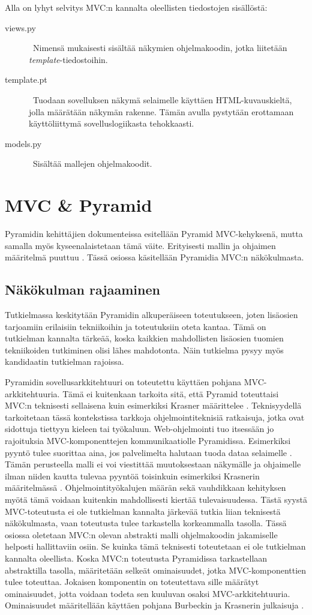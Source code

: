 \documentclass[finnish,utf8,nonumbib,palatino,kandi]{gradu2}
\begin{document}
Alla on lyhyt selvitys MVC:n kannalta oleellisten tiedostojen sisällöstä:
\begin{description}
\item [views.py] \ Nimensä mukaisesti sisältää näkymien ohjelmakoodin, jotka liitetään \emph{template}-tiedostoihin.
\item[template.pt] \ Tuodaan sovelluksen näkymä selaimelle käyttäen HTML-kuvauskieltä, jolla määrätään näkymän rakenne. Tämän avulla pystytään erottamaan käyttöliittymä sovelluslogiikasta tehokkaasti.
\item[models.py] \ Sisältää mallejen ohjelmakoodit.
\end{description}

\section{MVC \& Pyramid}
Pyramidin kehittäjien dokumenteissa esitellään Pyramid MVC-kehyksenä, mutta samalla myös kyseenalaistetaan tämä väite. Erityisesti mallin ja ohjaimen määritelmä puuttuu \cite{Pyramid:intr}. Tässä
osiossa käsitellään Pyramidia MVC:n näkökulmasta. 

\subsection{Näkökulman rajaaminen}
Tutkielmassa keskitytään Pyramidin alkuperäiseen toteutukseen, joten lisäosien tarjoamiin erilaisiin tekniikoihin ja toteutuksiin oteta kantaa. Tämä on tutkielman kannalta tärkeää, koska kaikkien
mahdollisten lisäosien tuomien tekniikoiden tutkiminen olisi lähes mahdotonta. Näin tutkielma pysyy myös kandidaatin tutkielman rajoissa.

Pyramidin sovellusarkkitehtuuri on toteutettu käyttäen pohjana MVC-arkkitehtuuria. Tämä ei kuitenkaan tarkoita sitä, että Pyramid toteuttaisi MVC:n teknisesti sellaisena kuin esimerkiksi Krasner määrittelee \cite{Krasner:desc}. Teknisyydellä
tarkoitetaan tässä kontekstissa tarkkoja ohjelmointiteknisiä ratkaisuja, jotka ovat sidottuja tiettyyn kieleen tai työkaluun. Web-ohjelmointi tuo itsessään jo rajoituksia MVC-komponenttejen kommunikaatiolle
Pyramidissa. Esimerkiksi pyyntö tulee suorittaa aina, jos palvelimelta halutaan tuoda dataa selaimelle \cite{Web}. Tämän perusteella malli ei voi viestittää muutoksestaan näkymälle ja ohjaimelle ilman niiden kautta tulevaa pyyntöä toisinkuin esimerkiksi Krasnerin määritelmässä \cite{Krasner}. Ohjelmointityökalujen määrän sekä vauhdikkaan kehityksen myötä tämä voidaan kuitenkin mahdollisesti kiertää tulevaisuudessa. Tästä syystä MVC-toteutusta ei ole tutkielman kannalta järkevää tutkia liian teknisestä näkökulmasta, vaan toteutusta tulee tarkastella korkeammalla tasolla. Tässä osiossa oletetaan MVC:n olevan abstrakti malli ohjelmakoodin jakamiselle helposti hallittaviin osiin. Se kuinka tämä teknisesti toteutetaan ei ole tutkielman kannalta oleellista.
Koska MVC:n toteutusta Pyramidissa tarkastellaan abstraktilla tasolla, määritetään selkeät ominaisuudet, jotka MVC-komponenttien tulee toteuttaa. Jokaisen komponentin on toteutettava sille määrätyt ominaisuudet, jotta voidaan todeta sen kuuluvan osaksi MVC-arkkitehtuuria. Ominaisuudet määritellään käyttäen pohjana Burbeckin ja Krasnerin julkaisuja \cite{Burbeck, Krasner:desc}.
\end{document}
